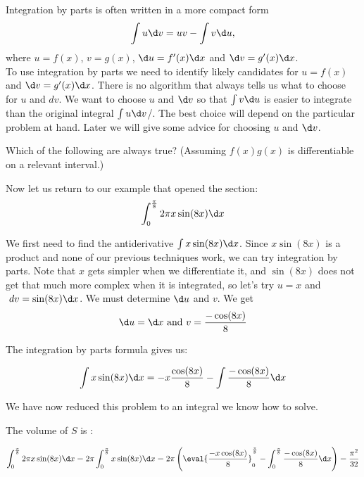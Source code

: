 \documentclass{ximera}
\begin{document}
Integration by parts is often written in a more compact form
\[
\int u\d v = uv-\int v\d u,
\]
where $u=f(x)$, $v=g(x)$, $\d u=f'(x)\d x$ and $\d v=g'(x)\d x$.  \\

To use integration by parts we need to identify likely candidates for $u=f(x)$ and
$\d v=g'(x)\d x$.  There is no algorithm that always tells us what to choose for $u$ and $dv$. We want to choose $u$ and $\d v$ so that $\int v \d u$ is easier to integrate than the original integral $\int u \d v$/.  The best choice will depend on the particular problem at hand. Later we will give some advice for choosing $u$ and $\d v$. 

\begin{question}
  Which of the following are always true? (Assuming $f(x)g(x)$ is
  differentiable on a relevant interval.)
  \begin{selectAll}
  \end{selectAll}
\end{question}

\begin{example}
Now let us return to our example that opened the section:
\[
\int_{0}^{\frac{\pi}{8}} 2 \pi x\sin(8x) \d x
\]

\begin{explanation}
We first need to find the antiderivative $\int x\sin(8x) \d x$.  Since $x\sin(8x)$ is a product and none of our previous techniques work, we can try integration by parts.  Note that $x$ gets simpler when we differentiate it, and $\sin(8x)$ does not get that much more complex when it is integrated, so let's try $u=x$ and $\ dv=\sin(8x) \d x$.  
We must determine $\d u$ and  $v$. We get
\[ \d u=\d x \text{ and } v=\frac{-\cos(8x)}{8} \]

The integration by parts formula gives us:

\[ 
\int x\sin(8x) \d x= -x\frac{\cos(8x)}{8} -\int \frac{-\cos(8x)}{8} \d x 
\]

We have now reduced this problem to an integral we know how to solve.  

The volume of $S$ is :

\[ 
\int_{0}^{\frac{\pi}{8}} 2 \pi x\sin(8x) \d x= 2 \pi \int_{0}^{\frac{\pi}{8}} x\sin(8x) \d x= 2 \pi \left( \eval{\frac{-x\cos(8x)}{8}}_0^\frac{\pi}{8}- \int_{0}^{\frac{\pi}{8}} \frac{-\cos(8x)}{8} \d x \right)=\frac{\pi^{2}}{32}
\]

\end{explanation}
\end{example}
\end{document}
